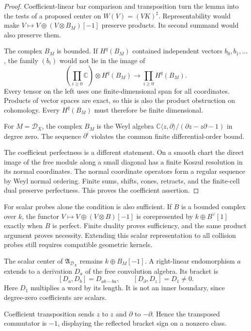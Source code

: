 \begin{proof}
Coefficient-linear bar comparison
and transposition turn the lemma
into the tests of a proposed center
on $W(V)=(VK)^\sharp$.
Representability would make
$V\mapsto V\oplus(V\otimes B_M)[-1]$
preserve products. Its second
summand would also preserve them.

The complex $B_M$ is bounded.
If $H^q(B_M)$ contained independent
vectors $b_0,b_1,\ldots$, the family
$(b_i)$ would not lie in the image
of
\[
 \left(\prod_{i\geq0}\mathbb C\right)
       \otimes H^q(B_M)
 \longrightarrow
 \prod_{i\geq0}H^q(B_M).
\]
Every tensor on the left uses one
finite-dimensional span for all
coordinates. Products of vector
spaces are exact, so this is also
the product obstruction on
cohomology. Every $H^q(B_M)$ must
therefore be finite dimensional.

For $M=\mathcal D_X$, the complex
$B_M$ is the Weyl algebra
$\mathbb C\langle z,\partial\rangle/
(\partial z-z\partial-1)$ in degree
zero. The sequence $\partial^i$
violates the common finite
differential-order bound.

The coefficient perfectness is a
different statement. On a smooth
chart the direct image of the
free module along a small diagonal
has a finite Koszul resolution
in its normal coordinates.
The normal coordinate operators
form a regular sequence by Weyl
normal ordering. Finite sums,
shifts, cones, retracts, and the
finite-cell dual preserve
perfectness. This proves the
coefficient assertion.
\end{proof}

For scalar probes alone the condition
is also sufficient. If $B$ is a
bounded complex over $k$, the
functor
$V\mapsto V\oplus(V\otimes B)[-1]$
is corepresented by
$k\oplus B^\vee[1]$ exactly when
$B$ is perfect. Finite duality
proves sufficiency, and the same
product argument proves necessity.
Extending this scalar representation
to all collision probes still
requires compatible geometric
kernels.

The scalar center of
$\mathfrak A_{\mathcal D_X}$ remains
$k\oplus B_M[-1]$. A right-linear
endomorphism $a$ extends to a
derivation $D_a$ of the free
convolution algebra. Its bracket
is
\[
 [D_a,D_b]=D_{ab-ba},\qquad
 [D_\partial,D_z]=D_1\ne0.
\]
Here $D_1$ multiplies a word by
its length. It is not an inner
boundary, since degree-zero
coefficients are scalars.

Coefficient transposition sends
$z$ to $z$ and $\partial$ to
$-\partial$. Hence the transposed
commutator is $-1$, displaying
the reflected bracket sign
on a nonzero class.


